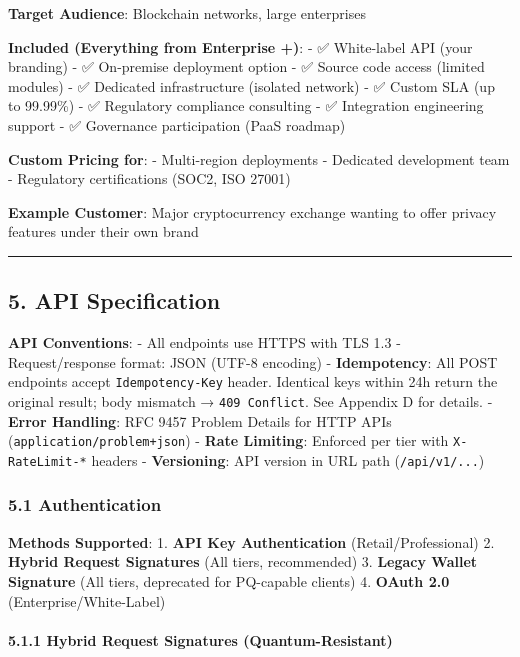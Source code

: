 \documentclass[
  11pt,
]{article}
\begin{document}
\textbf{Target Audience}: Blockchain networks, large enterprises

\textbf{Included (Everything from Enterprise +)}: - ✅ White-label API
(your branding) - ✅ On-premise deployment option - ✅ Source code
access (limited modules) - ✅ Dedicated infrastructure (isolated
network) - ✅ Custom SLA (up to 99.99\%) - ✅ Regulatory compliance
consulting - ✅ Integration engineering support - ✅ Governance
participation (PaaS roadmap)

\textbf{Custom Pricing for}: - Multi-region deployments - Dedicated
development team - Regulatory certifications (SOC2, ISO 27001)

\textbf{Example Customer}: Major cryptocurrency exchange wanting to
offer privacy features under their own brand

\begin{center}\rule{0.5\linewidth}{0.5pt}\end{center}

\hypertarget{api-specification}{%
\subsection{5. API Specification}\label{api-specification}}

\textbf{API Conventions}: - All endpoints use HTTPS with TLS 1.3 -
Request/response format: JSON (UTF-8 encoding) - \textbf{Idempotency}:
All POST endpoints accept \texttt{Idempotency-Key} header. Identical
keys within 24h return the original result; body mismatch →
\texttt{409\ Conflict}. See Appendix D for details. - \textbf{Error
Handling}: RFC 9457 Problem Details for HTTP APIs
(\texttt{application/problem+json}) - \textbf{Rate Limiting}: Enforced
per tier with \texttt{X-RateLimit-*} headers - \textbf{Versioning}: API
version in URL path (\texttt{/api/v1/...})

\hypertarget{authentication}{%
\subsubsection{5.1 Authentication}\label{authentication}}

\textbf{Methods Supported}: 1. \textbf{API Key Authentication}
(Retail/Professional) 2. \textbf{Hybrid Request Signatures} (All tiers,
recommended) 3. \textbf{Legacy Wallet Signature} (All tiers, deprecated
for PQ-capable clients) 4. \textbf{OAuth 2.0} (Enterprise/White-Label)

\hypertarget{hybrid-request-signatures-quantum-resistant}{%
\paragraph{5.1.1 Hybrid Request Signatures
(Quantum-Resistant)}\label{hybrid-request-signatures-quantum-resistant}}
\end{document}
